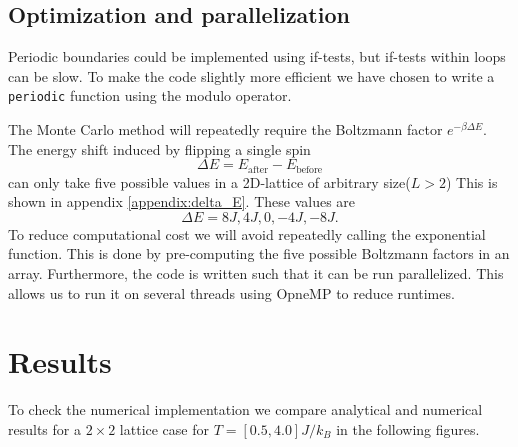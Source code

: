 \documentclass[english,notitlepage,reprint,nofootinbib]{revtex4-1}  %
\begin{document}
\subsection*{Optimization and parallelization}
Periodic boundaries could be implemented using if-tests, but if-tests within loops can be slow. To make the code slightly more efficient we have chosen to write a \texttt{periodic} function using the modulo operator.

The Monte Carlo method will repeatedly require the Boltzmann factor $e^{-\beta \Delta E}$. The energy shift induced by flipping a single spin 
\begin{equation}
    \Delta E = E_{\text{after}} - E_{\text{before}}
\end{equation}
can only take five possible values in a 2D-lattice of arbitrary size($L > 2$) This is shown in appendix \ref{appendix:delta_E}. These values are
\begin{equation}
    \Delta E = 8J, 4J, 0, -4J, -8J.
\end{equation}
To reduce computational cost we will avoid repeatedly calling the exponential function. This is done by pre-computing the five possible Boltzmann factors in an array.
Furthermore, the code is written such that it can be run parallelized. This allows us to run it on several threads using OpneMP to reduce runtimes.

\onecolumngrid
\section{Results}\label{sec:results}
To check the numerical implementation we compare analytical and numerical results for a $2\times2$ lattice case for $T=[0.5,4.0]J/k_B$ in the following figures.
\end{document}
